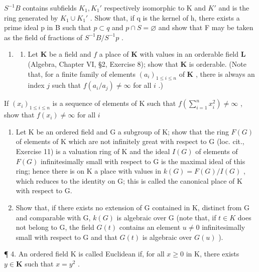 \(S^{-1}B\) contains subfields \(K_{1}, K_{1}'\) respectively isomorphic to K and \(K'\) and is the ring generated by \(K_{1} \cup K_{1}'\) . Show that, if q is the kernel of h, there exists a prime ideal p in B such that \(p \subset q\) and \(p \cap S = \varnothing\) and show that F may be taken as the field of fractions of \(S^{-1}B/S^{-1}p\) .

\begin{enumerate}
\def\labelenumi{\arabic{enumi}.}
\setcounter{enumi}{2}
\tightlist
\item
  \begin{enumerate}
  \def\labelenumii{(\alph{enumii})}
  \tightlist
  \item
    Let \(\mathbf{K}\) be a field and \(f\) a place of \(\mathbf{K}\) with values in an orderable field \(\mathbf{L}\) (Algebra, Chapter VI, §2, Exercise 8); show that \(\mathbf{K}\) is orderable. (Note that, for a finite family of elements \((a_i)_{1\leq i\leq n}\) of \(\mathbf{K}\) , there is always an index \(j\) such that \(f(a_i / a_j)\neq \infty\) for all \(i\) .)
  \end{enumerate}
\end{enumerate}

If \((x_{i})_{1\leqslant i\leqslant n}\) is a sequence of elements of K such that \(f\left(\sum_{i = 1}^{n}x_{i}^{2}\right)\neq \infty\) , show that \(f(x_{i})\neq \infty\) for all \(i\)

\begin{enumerate}
\def\labelenumi{(\alph{enumi})}
\setcounter{enumi}{1}
\item
  Let K be an ordered field and G a subgroup of K; show that the ring \(F(G)\) of elements of K which are not infinitely great with respect to G (loc. cit., Exercise 11) is a valuation ring of K and the ideal \(I(G)\) of elements of \(F(G)\) infinitesimally small with respect to G is the maximal ideal of this ring; hence there is on K a place with values in \(k(G) = F(G)/I(G)\) , which reduces to the identity on G; this is called the canonical place of K with respect to G.
\item
  Show that, if there exists no extension of G contained in K, distinct from G and comparable with G, \(k(G)\) is algebraic over G (note that, if \(t \in K\) does not belong to G, the field \(G(t)\) contains an element \(u \neq 0\) infinitesimally small with respect to G and that \(G(t)\) is algebraic over \(G(u)\) ).
\end{enumerate}

¶ 4. An ordered field K is called Euclidean if, for all \(x \geqslant 0\) in K, there exists \(y \in \mathbf{K}\) such that \(x = y^2\) .

